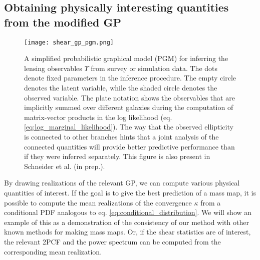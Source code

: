 \subsection{Obtaining physically interesting quantities from the modified GP}
\begin{figure}
	\centering
	\texttt{[image: shear\_gp\_pgm.png]}
	\caption{A simplified probabilistic graphical model (PGM) for inferring
		the lensing observables $\Upsilon$ from survey or simulation data. The dots
		denote fixed parameters in the inference procedure. The empty circle denotes
		the latent variable, while the shaded circle denotes 
		the observed variable. The plate notation shows the observables that are
		implicitly summed over different galaxies during the computation of matrix-vector
		products in the log likelihood (eq. \ref{eq:log_marginal_likelihood}). The way that the observed
		ellipticity is connected to other branches hints that a joint analysis of
		the connected quantities will provide better predictive performance than if
		they were inferred separately. This figure is also present in Schneider et
		al. (in prep.).
		\label{fig:simplified_pgm}}
\end{figure}


By drawing realizations of the relevant GP, we can compute various 
physical quantities of interest. If the goal is to give the best prediction of a
mass map, it is possible to compute the mean realizations of the
convergence $\kappa$ from a conditional PDF
analogous to eq. \ref{eq:conditional_distribution}. 
We will show an example of this as a demonstration of
the consistency of our method with other known methods for making mass maps.
Or, if the shear statistics are of interest, the relevant 2PCF and the power
spectrum can be computed from the corresponding mean realization.

